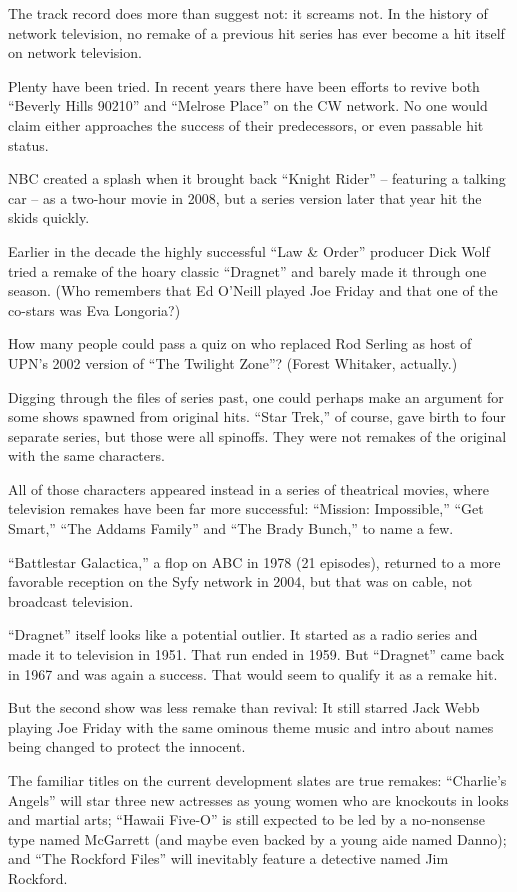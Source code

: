 ﻿\documentclass[12pt]{article}
\begin{document}
The track record does more than suggest not: it screams not. In the history of network television,
no remake of a previous hit series has ever become a hit itself on network television.

Plenty have been tried. In recent years there have been efforts to revive both ``Beverly Hills
90210'' and ``Melrose Place'' on the CW network. No one would claim either approaches the success of
their predecessors, or even passable hit status.

NBC created a splash when it brought back ``Knight Rider'' -- featuring a talking car -- as a
two-hour movie in 2008, but a series version later that year hit the skids quickly.

Earlier in the decade the highly successful ``Law \& Order'' producer Dick Wolf tried a remake of
the hoary classic ``Dragnet'' and barely made it through one season. (Who remembers that Ed O'Neill
played Joe Friday and that one of the co-stars was Eva Longoria?)

How many people could pass a quiz on who replaced Rod Serling as host of UPN's 2002 version of ``The
Twilight Zone''? (Forest Whitaker, actually.)

Digging through the files of series past, one could perhaps make an argument for some shows spawned
from original hits. ``Star Trek,'' of course, gave birth to four separate series, but those were all
spinoffs. They were not remakes of the original with the same characters.

All of those characters appeared instead in a series of theatrical movies, where television remakes
have been far more successful: ``Mission: Impossible,'' ``Get Smart,'' ``The Addams Family'' and
``The Brady Bunch,'' to name a few.

``Battlestar Galactica,'' a flop on ABC in 1978 (21 episodes), returned to a more favorable
reception on the Syfy network in 2004, but that was on cable, not broadcast television.

``Dragnet'' itself looks like a potential outlier. It started as a radio series and made it to
television in 1951. That run ended in 1959. But ``Dragnet'' came back in 1967 and was again a
success. That would seem to qualify it as a remake hit.

But the second show was less remake than revival: It still starred Jack Webb playing Joe Friday with
the same ominous theme music and intro about names being changed to protect the innocent.

The familiar titles on the current development slates are true remakes: ``Charlie's Angels'' will
star three new actresses as young women who are knockouts in looks and martial arts; ``Hawaii
Five-O'' is still expected to be led by a no-nonsense type named McGarrett (and maybe even backed by
a young aide named Danno); and ``The Rockford Files'' will inevitably feature a detective named Jim
Rockford.
\end{document}
